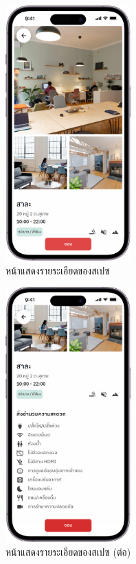 \begin{figure}[ht]
    \begin{center}
    \includegraphics[width=1.9in]{./image/Flowy_info_1.png}
    \end{center}
    \caption[Flowy info 1]{หน้าแสดงรายระเอียดของสเปซ}
    \label{fig:Flowy_info_1}
\end{figure}
\begin{figure}[ht]
    \begin{center}
    \includegraphics[width=1.9in]{./image/Flowy_info_2.png}
    \end{center}
    \caption[Flowy info 2]{หน้าแสดงรายระเอียดของสเปซ (ต่อ)}
    \label{fig:Flowy_info_2}
\end{figure}
